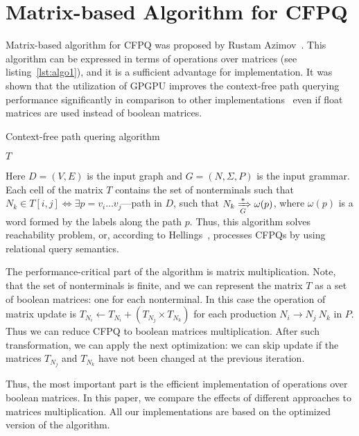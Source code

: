 \section{Matrix-based Algorithm for CFPQ}

Matrix-based algorithm for CFPQ was proposed by Rustam Azimov~\cite{Azimov:2018:CPQ:3210259.3210264}.
This algorithm can be expressed in terms of operations over matrices (see listing~\ref{lst:algo1}), and it is a sufficient advantage for implementation.
It was shown that the utilization of GPGPU improves the context-free path querying performance significantly in comparison to other implementations~\cite{Azimov:2018:CPQ:3210259.3210264} even if float matrices are used instead of boolean matrices.

\begin{algorithm}
\begin{algorithmic}[1]
\caption{Context-free path quering algorithm}
\label{lst:algo1}

    \EndFor

    \EndWhile
\State \Return $T$
\EndFunction
\end{algorithmic}
\end{algorithm}

Here $D = (V, E)$ is the input graph and $G = (N,\Sigma,P)$ is the input grammar.
Each cell of the matrix $T$ contains the set of nonterminals such that $N_k \in T[i,j] \iff \exists p = v_i \ldots v_j $---path in $D$, such that $N_k \xRightarrow[G]{*} \omega(p) $, where $\omega(p)$ is a word formed by the labels along the path $p$.
Thus, this algorithm solves reachability problem, or, according to Hellings~\cite{hellingsRelational}, processes CFPQs by using relational query semantics.

The performance-critical part of the algorithm is matrix multiplication.
Note, that the set of nonterminals is finite, and we can represent the matrix $T$ as a set of boolean matrices: one for each nonterminal.
In this case the operation of matrix update is $T_{N_i} \leftarrow T_{N_i} + (T_{N_j} \times T_{N_k})$ for each production $N_i \rightarrow N_j \ N_k$ in $P$.
Thus we can reduce CFPQ to boolean matrices multiplication.
After such transformation, we can apply the next optimization: we can skip update if the matrices $T_{N_j}$ and $T_{N_k}$ have not been changed at the previous iteration.

Thus, the most important part is the efficient implementation of operations over boolean matrices.
In this paper, we compare the effects of different approaches to matrices multiplication.
All our implementations are based on the optimized version of the algorithm.
